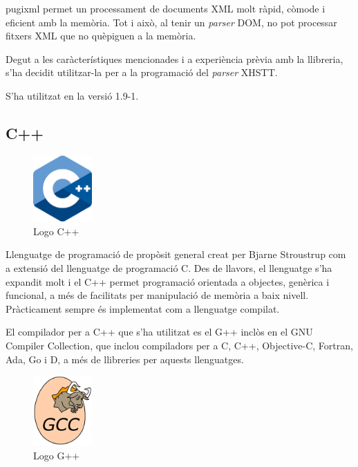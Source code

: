 \documentclass[11pt,a4paper,twoside]{report}
\begin{document}
  pugixml permet un processament de documents XML molt ràpid, còmode i eficient amb la memòria. Tot i això, al tenir un \textit{parser} DOM, no pot processar fitxers XML que no quèpiguen a la memòria.
  
  Degut a les caràcterístiques mencionades i a experiència prèvia amb la llibreria, s'ha decidit utilitzar-la per a la programació del \textit{parser} XHSTT. 

  S'ha utilitzat en la versió 1.9-1.

  \subsection{C++}
  \begin{figure}[ht!]
    \centering
    \includegraphics[width=0.2\textwidth]{Diagrames/cpp.png}
    \caption{Logo C++}
    \label{fig:cpp}
  \end{figure}
  
  Llenguatge de programació de propòsit general creat per Bjarne Stroustrup com a extensió del llenguatge de programació C. 
  Des de llavors, el llenguatge s'ha expandit molt i el C++ permet programació orientada a objectes, genèrica i funcional, a més de facilitats per manipulació de memòria a baix nivell. 
  Pràcticament sempre és implementat com a llenguatge compilat.

  El compilador per a C++ que s'ha utilitzat es el G++ inclòs en el GNU Compiler Collection, que inclou compiladors per a C, C++, Objective-C, Fortran, Ada, Go i D, a més de llibreries per aquests llenguatges. 
  

  \begin{figure}[ht!]
    \centering
    \includegraphics[width=0.2\textwidth]{Diagrames/gcc.png}
    \caption{Logo G++}
    \label{fig:gpp}
  \end{figure}
\end{document}
